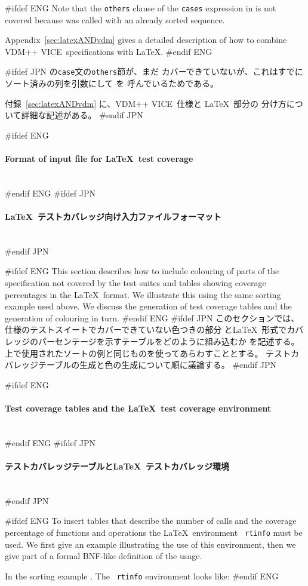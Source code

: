 \documentclass[\pformat,12pt]{article}
\newcommand{\vdmslpp}{VDM-SL}
\newcommand{\vdmslpp}{VDM++}
\renewcommand{\vdmslpp}{VDM++ VICE}
\newcommand{\subsubsubsection}[1]{\paragraph{#1}\mbox{}\\}
\begin{document}
#ifdef ENG
Note that the {\tt others} clause of the {\tt cases} expression in
 is not covered because
 was
called with an already sorted sequence.

Appendix~\ref{sec:latexANDvdm} gives a detailed description of how to
combine \vdmslpp\ specifications with \LaTeX.
#endif ENG

#ifdef JPN
 の{\tt case}文の{\tt others}節が、まだ
カバーできていないが、これはすでにソート済みの列を引数にして
 を
呼んでいるためである。

付録~\ref{sec:latexANDvdm} に、\vdmslpp\ 仕様と \LaTeX\ 部分の
分け方について詳細な記述がある。
#endif JPN

#ifdef ENG
\subsubsubsection{Format of input file for \LaTeX\ test coverage}
#endif ENG
#ifdef JPN
\subsubsubsection{\LaTeX\ テストカバレッジ向け入力ファイルフォーマット}
#endif JPN

#ifdef ENG
This section describes how to include colouring of parts of the
specification not covered by the test suites and tables showing
coverage percentages in the \LaTeX\ format. We illustrate this using
the same sorting example used above. We discuss the generation of test
coverage tables and the generation of colouring in turn.
#endif ENG
#ifdef JPN
このセクションでは、仕様のテストスイートでカバーできていない色つきの部分
と\LaTeX\ 形式でカバレッジのパーセンテージを示すテーブルをどのように組み込むか
を記述する。上で使用されたソートの例と同じものを使ってあらわすこととする。
テストカバレッジテーブルの生成と色の生成について順に議論する。
#endif JPN

#ifdef ENG
\subsubsubsection{Test coverage tables and the \LaTeX\ test coverage environment}
#endif ENG
#ifdef JPN
\subsubsubsection{テストカバレッジテーブルと\LaTeX\ テストカバレッジ環境}
#endif JPN

#ifdef ENG
To insert tables that describe the number of calls and the coverage
percentage of functions and operations the \LaTeX\ environment {\tt
  rtinfo} must be used.  We first give an example illustrating the use
of this environment, then we give part of a formal BNF-like definition
of the usage.

In the sorting example .  The {\tt
  rtinfo} environment looks like:
#endif ENG
\end{document}
